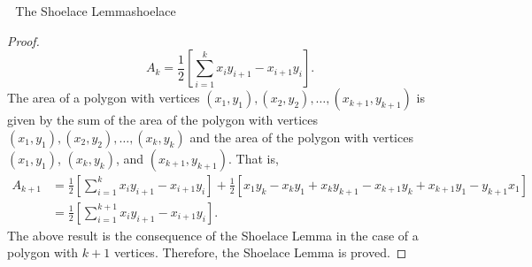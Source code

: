 \begin{exercise}{\Difficulty\,\Difficulty\,\Difficulty\,\,The Shoelace Lemma}{shoelace}
\begin{proof}
            \begin{equation*}
                A_k=\frac{1}{2}\left[\sum_{i=1}^k x_iy_{i+1}-x_{i+1}y_i \right].
            \end{equation*}
            The area of a polygon with vertices \((x_1, y_1), (x_2, y_2), \ldots, (x_{k+1}, y_{k+1})\) is given by the sum of the area of the polygon with vertices \((x_1, y_1), (x_2, y_2), \ldots, (x_k, y_k)\) and the area of the polygon with vertices \((x_1, y_1)\), \((x_k, y_k)\), and \((x_{k+1}, y_{k+1})\). That is,
            \begin{align*}
                A_{k+1}&=\frac{1}{2}\left[\sum_{i=1}^k x_iy_{i+1}-x_{i+1}y_i \right]+\frac{1}{2}\left[x_1y_k-x_ky_1+x_ky_{k+1}-x_{k+1}y_k+x_{k+1}y_1-y_{k+1}x_1\right] \\
                &=\frac{1}{2}\left[\sum_{i=1}^{k+1} x_iy_{i+1}-x_{i+1}y_i \right].
            \end{align*}
            The above result is the consequence of the Shoelace Lemma in the case of a polygon with \(k+1\) vertices. Therefore, the Shoelace Lemma is proved.
        \end{proof}
    \end{exercise}
